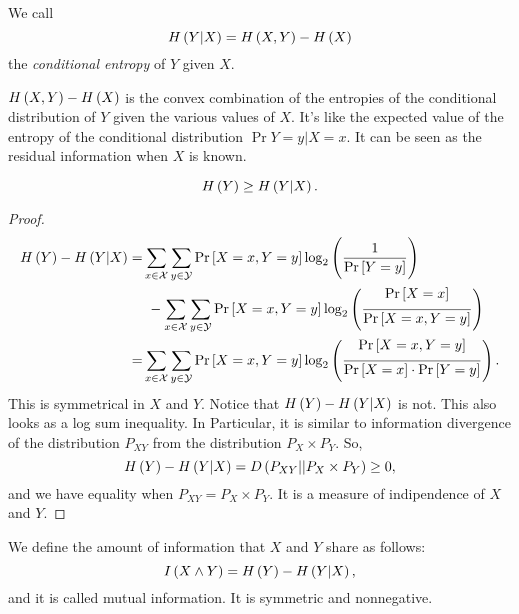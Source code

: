 \begin{definition}
	We call
	\begin{equation*}
		H\left({Y | X}\right) = H\left({X,Y}\right) - H\left({X}\right)
	\end{equation*}
	the \emph{conditional entropy} of $Y$ given $X$.
\end{definition}

$H\left({X,Y}\right) - H\left({X}\right)$ is the convex combination of the entropies of the conditional distribution of $Y$ given the various values of $X$.
It's like the expected value of the entropy of the conditional distribution $\Pr{Y = y | X = x}$.
It can be seen as the residual information when $X$ is known.

\begin{prop}
	\begin{equation*}
	H\left({Y}\right) \ge H\left({Y | X}\right). 
	\end{equation*}
\end{prop}

\begin{proof}
	\begin{align*}
		H\left({Y}\right) - H\left({Y | X}\right)
		= &
		\sum_{x \in \mathcal{X}} \sum_{y \in \mathcal{Y}} \mathop{\mathrm{Pr}}\limits_{} \left[ {X = x, Y = y} \right]
		\log_2 \left( \frac{1}{\mathop{\mathrm{Pr}}\limits_{} \left[ {Y=y} \right]} \right)
		\\ 
		&~- \sum_{x \in \mathcal{X}} \sum_{y \in \mathcal{Y}} \mathop{\mathrm{Pr}}\limits_{} \left[ {X = x, Y = y} \right]
		\log_2 \left( \frac{\mathop{\mathrm{Pr}}\limits_{} \left[ {X = x} \right]}{\mathop{\mathrm{Pr}}\limits_{} \left[ {X = x, Y = y} \right]} \right)
		\\
		= &
		\sum_{x \in \mathcal{X}} \sum_{y \in \mathcal{Y}} \mathop{\mathrm{Pr}}\limits_{} \left[ {X = x, Y = y} \right]
		\log_2 \left( \frac{\mathop{\mathrm{Pr}}\limits_{} \left[ {X = x, Y = y} \right]}{\mathop{\mathrm{Pr}}\limits_{} \left[ {X = x} \right] \cdot \mathop{\mathrm{Pr}}\limits_{} \left[ {Y = y} \right]} \right).
	\end{align*}
	This is symmetrical in $X$ and $Y$.
	Notice that $H\left({Y}\right) - H\left({Y | X}\right)$ is not.
	This also looks as a log sum inequality.
	In Particular, it is similar to information divergence of the distribution $P_{XY}$ from the distribution $P_X \times P_Y$. So,
	\begin{equation*}
		H\left({Y}\right) - H\left({Y | X}\right)
		=
		D \left( P_{XY} || P_X \times P_Y \right)
		\ge 0,
	\end{equation*}
	and we have equality when $P_{XY} = P_X \times P_Y$.
	It is a measure of indipendence of $X$ and $Y$.
\end{proof}

\begin{definition}
	We define the amount of information that $X$ and $Y$ share as follows:
	\begin{equation*}
		I \left( {X \land Y} \right) = H\left({Y}\right) - H\left({Y | X}\right), 
	\end{equation*}
	and it is called mutual information.
	It is symmetric and nonnegative. 
\end{definition}

